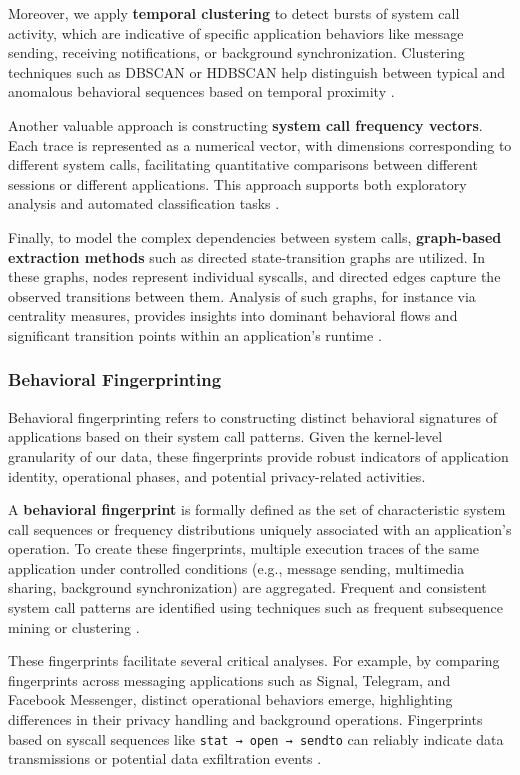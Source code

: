 \documentclass[a4paper,12pt]{report}
\begin{document}
Moreover, we apply \textbf{temporal clustering} to detect bursts of system call activity, which are indicative of specific application behaviors like message sending, receiving notifications, or background synchronization. Clustering techniques such as DBSCAN or HDBSCAN help distinguish between typical and anomalous behavioral sequences based on temporal proximity \cite{ester1996density}.

Another valuable approach is constructing \textbf{system call frequency vectors}. Each trace is represented as a numerical vector, with dimensions corresponding to different system calls, facilitating quantitative comparisons between different sessions or different applications. This approach supports both exploratory analysis and automated classification tasks \cite{bishop2007pattern}.

Finally, to model the complex dependencies between system calls, \textbf{graph-based extraction methods} such as directed state-transition graphs are utilized. In these graphs, nodes represent individual syscalls, and directed edges capture the observed transitions between them. Analysis of such graphs, for instance via centrality measures, provides insights into dominant behavioral flows and significant transition points within an application's runtime \cite{newman2010networks}.

\subsubsection{Behavioral Fingerprinting}
Behavioral fingerprinting refers to constructing distinct behavioral signatures of applications based on their system call patterns. Given the kernel-level granularity of our data, these fingerprints provide robust indicators of application identity, operational phases, and potential privacy-related activities.

A \textbf{behavioral fingerprint} is formally defined as the set of characteristic system call sequences or frequency distributions uniquely associated with an application's operation. To create these fingerprints, multiple execution traces of the same application under controlled conditions (e.g., message sending, multimedia sharing, background synchronization) are aggregated. Frequent and consistent system call patterns are identified using techniques such as frequent subsequence mining or clustering \cite{han2022datamining}.

These fingerprints facilitate several critical analyses. For example, by comparing fingerprints across messaging applications such as Signal, Telegram, and Facebook Messenger, distinct operational behaviors emerge, highlighting differences in their privacy handling and background operations. Fingerprints based on syscall sequences like \texttt{stat → open → sendto} can reliably indicate data transmissions or potential data exfiltration events \cite{enck2014taintdroid}.
\end{document}
